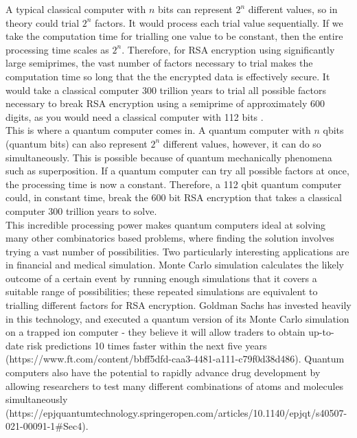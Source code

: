 A typical classical computer with $n$ bits can represent $2^n$ different values, so in theory could trial $2^n$ factors. It would process each trial value sequentially. If we take the computation time for trialling one value to be constant, then the entire processing time scales as $2^n$. Therefore, for RSA encryption using significantly large semiprimes, the vast number of factors necessary to trial makes the computation time so long that the the encrypted data is effectively secure. It would take a classical computer 300 trillion years to trial all possible factors necessary to break RSA encryption using a semiprime of approximately 600 digits, as you would need a classical computer with 112 bits \cite{quintessencelabs2022}.\\

This is where a quantum computer comes in. A quantum computer with $n$ qbits (quantum bits) can also represent $2^n$ different values, however, it can do so simultaneously. This is possible because of quantum mechanically phenomena such as superposition. If a quantum computer can try all possible factors at once, the processing time is now a constant. Therefore, a 112 qbit quantum computer could, in constant time, break the 600 bit RSA encryption that takes a classical computer 300 trillion years to solve.\\

This incredible processing power makes quantum computers ideal at solving many other combinatorics based problems, where finding the solution involves trying a vast number of possibilities. Two particularly interesting applications are in financial and medical simulation. Monte Carlo simulation calculates the likely outcome of a certain event by running enough simulations that it covers a suitable range of possibilities; these repeated simulations are equivalent to trialling different factors for RSA encryption. Goldman Sachs has invested heavily in this technology, and executed a quantum version of its Monte Carlo simulation on a trapped ion computer - they believe it will allow traders to obtain up-to-date risk predictions 10 times faster within the next five years (https://www.ft.com/content/bbff5dfd-caa3-4481-a111-c79f0d38d486). Quantum computers also have the potential to rapidly advance drug development by allowing researchers to test many different combinations of atoms and molecules simultaneously (https://epjquantumtechnology.springeropen.com/articles/10.1140/epjqt/s40507-021-00091-1#Sec4).\\

